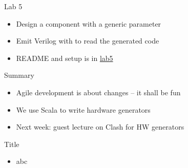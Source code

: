 \begin{frame}[fragile]{Lab 5}
\begin{itemize}
\item Design a component with a generic parameter
\item Emit Verilog with  to read the generated code
\item README and setup is in \href{https://github.com/schoeberl/agile-hw/tree/main/lab5}{lab5}
\end{itemize}
\end{frame}


\begin{frame}[fragile]{Summary}
\begin{itemize}
\item Agile development is about changes -- it shall be fun
\item We use Scala to write hardware generators
\item Next week: guest lecture on Clash for HW generators
\end{itemize}
\end{frame}


\begin{frame}[fragile]{Title}
\begin{itemize}
\item abc
\end{itemize}
\end{frame}
